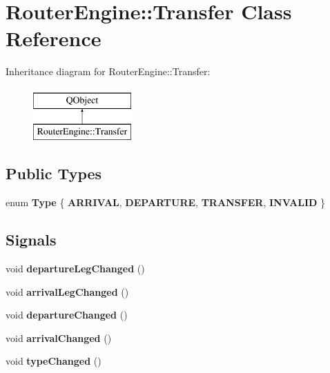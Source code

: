 \hypertarget{classRouterEngine_1_1Transfer}{}\section{Router\+Engine\+:\+:Transfer Class Reference}
\label{classRouterEngine_1_1Transfer}
Inheritance diagram for Router\+Engine\+:\+:Transfer\+:\begin{figure}[H]
\begin{center}
\leavevmode
\includegraphics[height=2.000000cm]{classRouterEngine_1_1Transfer}
\end{center}
\end{figure}
\subsection*{Public Types}
\begin{DoxyCompactItemize}
\item 
\mbox{\label{classRouterEngine_1_1Transfer_a2b79055b3dc55c7d9631a0d3e68155c5}} 
enum {\bfseries Type} \{ {\bfseries A\+R\+R\+I\+V\+AL}, 
{\bfseries D\+E\+P\+A\+R\+T\+U\+RE}, 
{\bfseries T\+R\+A\+N\+S\+F\+ER}, 
{\bfseries I\+N\+V\+A\+L\+ID}
 \}
\end{DoxyCompactItemize}
\subsection*{Signals}
\begin{DoxyCompactItemize}
\item 
\mbox{\label{classRouterEngine_1_1Transfer_a727ff091ea2464cc1e6a5fa41dd38a9e}} 
void {\bfseries departure\+Leg\+Changed} ()
\item 
\mbox{\label{classRouterEngine_1_1Transfer_a40b2a38cb0fcc48cc867409139242655}} 
void {\bfseries arrival\+Leg\+Changed} ()
\item 
\mbox{\label{classRouterEngine_1_1Transfer_ad82484af56ccf65ef26862da23f96e78}} 
void {\bfseries departure\+Changed} ()
\item 
\mbox{\label{classRouterEngine_1_1Transfer_a7832205361f2f6273d2de37a33f8e5ac}} 
void {\bfseries arrival\+Changed} ()
\item 
\mbox{\label{classRouterEngine_1_1Transfer_a366c6e5188577967c89d4c52898cc652}} 
void {\bfseries type\+Changed} ()
\end{DoxyCompactItemize}
